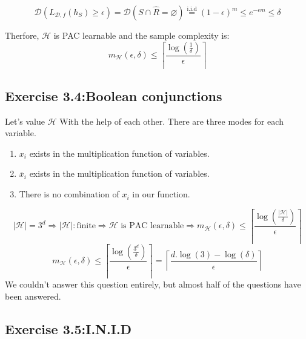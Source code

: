 \documentclass[]{book}
\begin{document}
\begin{equation*}
    \mathcal{D}(L_{\mathcal{D},f}(h_S)\geq \epsilon)=\mathcal{D}(S \cap \hat{R}=\varnothing )\overset{\text{i.i.d}}{=} (1-\epsilon)^m\leq e^{-\epsilon m} \leq \delta
\end{equation*}

Therfore, $\mathcal{H}$ is PAC learnable and the sample complexity is:
\begin{equation*}
    m_{\mathcal{H}}(\epsilon,\delta)\leq \left \lceil \frac{\log \left ( \frac{1}{\delta} \right )}{\epsilon} \right \rceil
\end{equation*}

\subsection*{Exercise 3.4:Boolean conjunctions}

Let's value $\mathcal{H}$ With the help of each other. There are three modes for each variable.


\begin{enumerate}
    \item $x_i$ exists in the multiplication function of variables.
    \item $\overline{x}_i$ exists in the multiplication function of variables.
    \item There is no combination of $x_i$ in our function.
\end{enumerate}

\begin{equation*}
    \left | \mathcal{H} \right |=3^d\Rightarrow \left | \mathcal{H} \right |:\text{finite}\Rightarrow \text{$\mathcal{H}$ is PAC learnable} \Rightarrow m_{\mathcal{H}}(\epsilon,\delta)\leq \left \lceil \frac{\log \left ( \frac{\left | \mathcal{H} \right |}{\delta} \right )}{\epsilon} \right \rceil
\end{equation*}
\begin{equation*}
    m_{\mathcal{H}}(\epsilon,\delta)\leq \left \lceil \frac{\log \left ( \frac{3^d}{\delta} \right )}{\epsilon} \right \rceil = \left \lceil \frac{d.\log \left ( 3 \right )-\log(\delta)}{\epsilon} \right \rceil
\end{equation*}
We couldn't answer this question entirely, but almost half of the questions have been answered.

\subsection*{Exercise 3.5:I.N.I.D}
\end{document}
